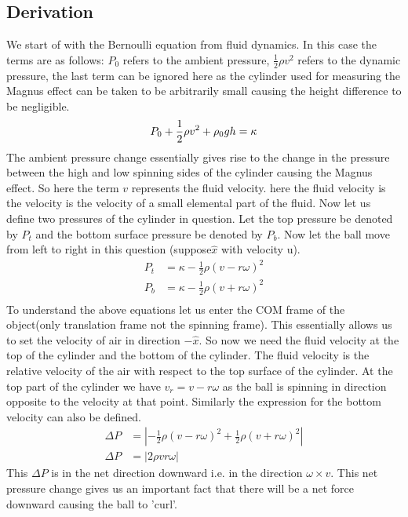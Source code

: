 \documentclass[a4paper]{article}
\begin{document}
\subsection{Derivation}
We start of with the Bernoulli equation from fluid dynamics.
In this case the terms are as follows: $P_0$ refers to the ambient pressure, $\frac{1}{2}\rho v^2$ refers to the dynamic pressure, the last term can be ignored here as the cylinder used for measuring the Magnus effect can be taken to be arbitrarily small causing the height difference to be negligible.
\begin{equation}
    P_0 + \frac{1}{2}\rho v^2 +\rho_0 gh = \kappa \\
\end{equation}
The ambient pressure change essentially gives rise to the change in the pressure between the high and low spinning sides of the cylinder causing the Magnus effect. So here the term $v$ represents the fluid velocity. here the fluid velocity is the velocity is the velocity of a small elemental part of the fluid. Now let us define two pressures of the cylinder in question. Let the top pressure be denoted by $P_t$ and the bottom surface pressure be denoted by $P_b$. Now let the ball move from left to right in this question (suppose$\hat{x}$ with velocity u).
\begin{align*}
    P_t &= \kappa - \frac{1}{2}\rho(v-r\omega)^2\\
    P_b &= \kappa - \frac{1}{2}\rho(v+r\omega)^2\\
\end{align*}
To understand the above equations let us enter the COM frame of the object(only translation frame not the spinning frame). This essentially allows us to set the velocity of air in direction $-\hat{x}$. So now we need the fluid velocity at the top of the cylinder and the bottom of the cylinder. The fluid velocity is the relative velocity of the air with respect to the top surface of the cylinder. At the top part of the cylinder we have $v_r = v-r\omega$ as the ball is spinning in direction opposite to the velocity at that point. Similarly the expression for the bottom velocity can also be defined.
\begin{align*}
    \Delta P &= |-\frac{1}{2}\rho(v-r\omega)^2 +\frac{1}{2}\rho(v+r\omega)^2|\\
    \Delta P &= |2\rho v r \omega|
\end{align*}
This $\Delta P$ is in the net direction downward i.e. in the direction $\omega \times v$. This net pressure change gives us an important fact that there will be a net force downward causing the ball to 'curl'.
\end{document}
